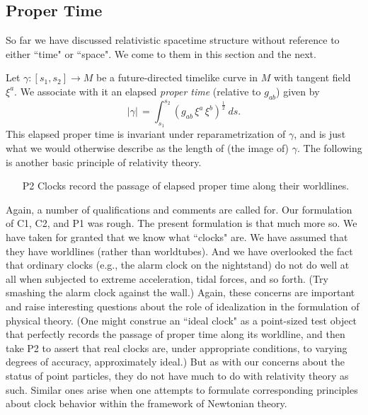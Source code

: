 \documentclass [12] {article}
\theoremstyle{plain}
\numberwithin{figure}{subsection}
\numberwithin{proposition}{subsection}
\begin{document}
\subsection{Proper Time}

So far we have discussed relativistic spacetime structure without reference to either ``time" or ``space". We come to them in this section and the next.  

Let $\gamma: [s_1, s_2] \rightarrow M$ be a future-directed timelike curve in $M$ with tangent field $\xi^a$. We associate with it an elapsed \emph{proper time}  (relative to $g_{ab}$) given by
\[
|\gamma| \,  =   \int_{s_1}^{s_2} (g_{ab} \,\xi^a  \, \xi^b)^\frac{1}{2} \ ds .
\] 
This elapsed proper time is invariant under reparametrization of $\gamma$, and is just what we would otherwise describe as the length of (the  image of) $\gamma$. The following is another basic principle of relativity theory. 
%
\begin{enumerate}
\item[P2] Clocks  record the passage of elapsed proper time along their worldlines.
\end{enumerate}

Again, a number of qualifications and comments are called for. Our formulation of C1, C2, and P1 was rough. The present formulation is that much more so.  We have taken for  granted that we know  what ``clocks" are. We have  assumed that they have worldlines (rather than worldtubes). And we have overlooked the fact that ordinary clocks (e.g., the  alarm clock on the  nightstand) do not do well at all when subjected  to extreme acceleration, tidal forces, and so forth. (Try smashing the alarm clock against the wall.)  Again, these concerns are important and raise interesting questions about the role of idealization in the formulation of physical theory. (One might construe an ``ideal clock" as a point-sized  test object that perfectly records the passage of proper time along its worldline, and then take P2 to assert that real clocks are, under appropriate conditions, to varying degrees of accuracy, approximately ideal.)  But as with our concerns about the status of point particles, they do not have much to do with relativity theory as such. Similar ones arise when one attempts to formulate corresponding principles about clock behavior within the  framework of Newtonian theory.
\end{document}

